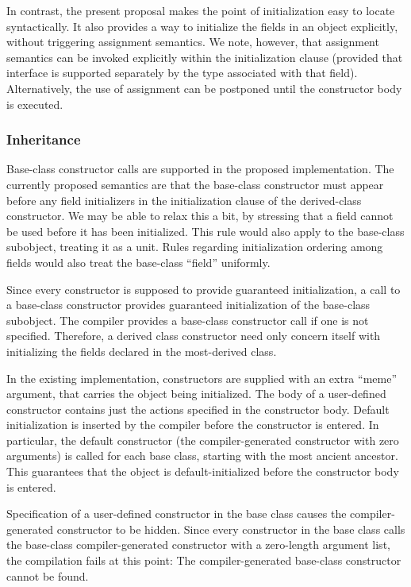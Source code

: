 In contrast, the present proposal makes the point of initialization
easy to locate syntactically.  It also provides a way to initialize the fields
in an object explicitly, without triggering assignment semantics.  
We note, however, that assignment semantics can be invoked explicitly within the
initialization clause (provided that interface is supported separately by the
type associated with that field).  Alternatively, the use of assignment can be
postponed until the constructor body is executed.

\subsubsection{Inheritance}

Base-class constructor calls are supported in the proposed implementation.  The
currently proposed semantics are that the base-class constructor must appear
before any field initializers in the initialization clause of the derived-class
constructor.  We may be able to relax this a bit, by stressing that a field
cannot be used before it has been initialized.  This rule would also apply to
the base-class subobject, treating it as a unit.  Rules regarding initialization
ordering among fields would also treat the base-class ``field'' uniformly.

Since every constructor is supposed to provide guaranteed initialization, a call
to a base-class constructor provides guaranteed initialization of the base-class
subobject.  The compiler provides a base-class constructor call if one is not
specified.  Therefore, a derived class constructor need only concern itself with
initializing the fields declared in the most-derived class.

In the existing implementation, constructors are supplied with an extra ``meme''
argument, that carries the object being initialized.  The body of a user-defined
constructor contains just the
actions specified in the constructor body.  Default initialization is inserted
by the compiler before the constructor is entered.  In particular, the default
constructor (the compiler-generated constructor with zero arguments) is called
for each base class, starting with the most ancient ancestor.  This guarantees
that the object is default-initialized before the constructor body is entered.

Specification of a user-defined constructor in the base class causes the
compiler-generated constructor to be hidden.  Since every constructor in the
base class calls the base-class compiler-generated constructor with a
zero-length argument list, the compilation fails at this point: The
compiler-generated base-class constructor cannot be found.

